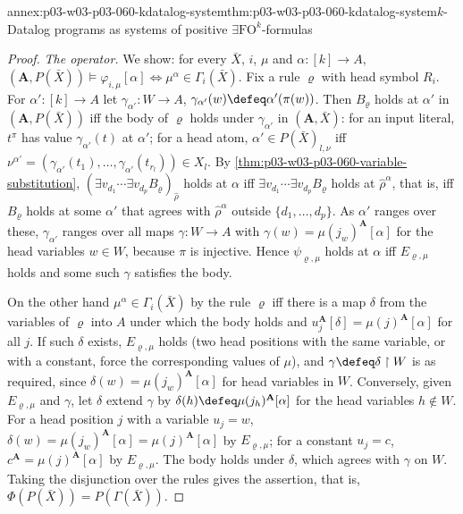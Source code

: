 \begin{annexitem}{annex:p03-w03-p03-060-kdatalog-system}{thm:p03-w03-p03-060-kdatalog-system}{\(k\)-Datalog programs as systems of positive \(\exists\mathrm{FO}^k\)-formulas}
\begin{proof}
\emph{The operator.} We show: for every \(\bar X\), \(i\), \(\mu\) and
\(\alpha\colon[k]\to A\),
\((\mathbf A,P(\bar X))\models\varphi_{i,\mu}[\alpha]\iff\mu^\alpha\in\Gamma_i(\bar X)\).
Fix a rule \(\varrho\) with head symbol \(R_i\). For
\(\alpha'\colon[k]\to A\) let \(\gamma_{\alpha'}\colon W\to A\),
\(\gamma_{\alpha'}(w)\defeq\alpha'(\pi(w))\). Then \(B_\varrho\) holds at
\(\alpha'\) in \((\mathbf A,P(\bar X))\) iff the body of \(\varrho\) holds
under \(\gamma_{\alpha'}\) in \((\mathbf A,\bar X)\): for an input
literal, \(t^\pi\) has value \(\gamma_{\alpha'}(t)\) at \(\alpha'\); for a
head atom, \(\alpha'\in P(\bar X)_{l,\nu}\) iff
\(\nu^{\alpha'}=(\gamma_{\alpha'}(t_1),\ldots,\gamma_{\alpha'}(t_{r_l}))\in X_l\).
By \cref{thm:p03-w03-p03-060-variable-substitution},
\((\exists v_{d_1}\cdots\exists v_{d_p}B_\varrho)_{\hat\rho}\) holds at
\(\alpha\) iff \(\exists v_{d_1}\cdots\exists v_{d_p}B_\varrho\) holds at
\(\hat\rho^\alpha\), that is, iff \(B_\varrho\) holds at some \(\alpha'\)
that agrees with \(\hat\rho^\alpha\) outside \(\{d_1,\ldots,d_p\}\). As
\(\alpha'\) ranges over these, \(\gamma_{\alpha'}\) ranges over all maps
\(\gamma\colon W\to A\) with \(\gamma(w)=\mu(j_w)^{\mathbf A}[\alpha]\) for
the head variables \(w\in W\), because \(\pi\) is injective. Hence
\(\psi_{\varrho,\mu}\) holds at \(\alpha\) iff \(E_{\varrho,\mu}\) holds and
some such \(\gamma\) satisfies the body.

On the other hand \(\mu^\alpha\in\Gamma_i(\bar X)\) by the rule
\(\varrho\) iff there is a map \(\delta\) from the variables of
\(\varrho\) into \(A\) under which the body holds and
\(u_j^{\mathbf A}[\delta]=\mu(j)^{\mathbf A}[\alpha]\) for all \(j\). If
such \(\delta\) exists, \(E_{\varrho,\mu}\) holds (two head positions with
the same variable, or with a constant, force the corresponding values of
\(\mu\)), and \(\gamma\defeq\delta\restriction W\) is as required, since
\(\delta(w)=\mu(j_w)^{\mathbf A}[\alpha]\) for head variables in \(W\).
Conversely, given \(E_{\varrho,\mu}\) and \(\gamma\), let \(\delta\) extend
\(\gamma\) by \(\delta(h)\defeq\mu(j_h)^{\mathbf A}[\alpha]\) for the head
variables \(h\notin W\). For a head position \(j\) with a variable \(u_j=w\),
\(\delta(w)=\mu(j_w)^{\mathbf A}[\alpha]=\mu(j)^{\mathbf A}[\alpha]\) by
\(E_{\varrho,\mu}\); for a constant \(u_j=c\),
\(c^{\mathbf A}=\mu(j)^{\mathbf A}[\alpha]\) by \(E_{\varrho,\mu}\). The body
holds under \(\delta\), which agrees with \(\gamma\) on \(W\). Taking the
disjunction over the rules gives the assertion, that is,
\(\Phi(P(\bar X))=P(\Gamma(\bar X))\).


\end{proof}
\end{annexitem}
